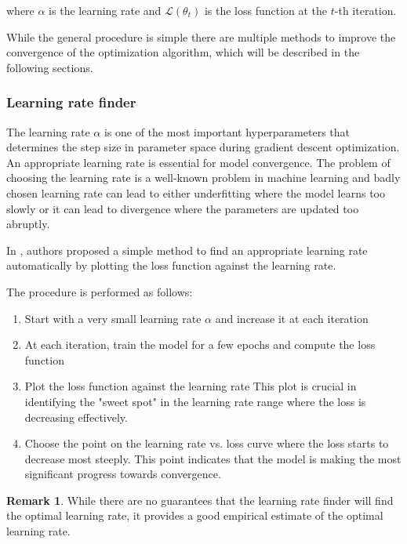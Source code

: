 \documentclass[a4paper, twoside]{report}
\theoremstyle{definition}
\newtheorem{remark}[theorem]{Remark}
\numberwithin{equation}{section}
\begin{document}
where $\alpha$ is the learning rate and $\mathcal{L}(\theta_t)$ is the loss function at the $t$-th iteration.

While the general procedure is simple there are multiple methods to improve the convergence of the optimization algorithm,
which will be described in the following sections.


\subsubsection{Learning rate finder} \label{sec:learning_rate_finder}
The learning rate $\alpha$ is one of the most important hyperparameters that determines the step size in parameter space
during gradient descent optimization. An appropriate learning rate is essential for
model convergence.
The problem of choosing the learning rate is a well-known problem in machine learning
and badly chosen learning rate can lead to either underfitting where the model
learns too slowly or it can lead to divergence where the parameters are updated too abruptly.

In \cite{1506.01186}, authors proposed a simple method to find an appropriate learning rate
automatically by plotting the loss function against the learning rate.

The procedure is performed as follows:
\begin{enumerate}
    \item Start with a very small learning rate $\alpha$ and increase it at each iteration
    \item At each iteration, train the model for a few epochs and compute the loss function
    \item Plot the loss function against the learning rate
          This plot is crucial in identifying the "sweet spot" in the learning rate range
          where the loss is decreasing effectively.
    \item Choose the point on the learning rate vs. loss curve where the
          loss starts to decrease most steeply.  This point indicates that the model
          is making the most significant progress towards convergence.
\end{enumerate}

\begin{remark}
    While there are no guarantees that the learning rate finder will find the optimal learning rate,
    it provides a good empirical estimate of the optimal learning rate.
\end{remark}
\end{document}
